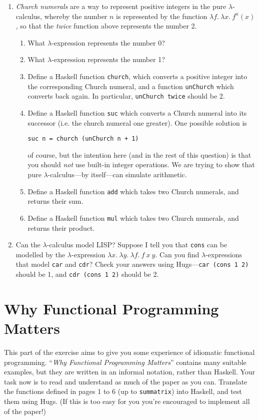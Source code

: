\documentclass{article}
\begin{document}
\begin{enumerate}
\item
{\em Church numerals} are a way to represent positive integers in the
pure $\lambda$-calculus, whereby the number $n$ is represented by the
function $\lambda f.~\lambda x.~f^n(x)$, so that the {\it twice}
function above represents the number 2.
\begin{enumerate}
\item
What $\lambda$-expression represents the number 0? 
\item
What $\lambda$-expression represents the number 1? 
\item 
Define a Haskell function \verb!church!, which converts a positive
integer into the corresponding Church numeral, and a function
\verb!unChurch! which converts back again. In particular,
\verb!unChurch twice! should be 2. 
\item 
Define a Haskell function \verb!suc! which converts a Church numeral
into its successor (i.e. the church numeral one greater). One possible
solution is 
\begin{verbatim}
suc n = church (unChurch n + 1)
\end{verbatim}
of course, but the intention here (and in the rest of this question)
is that you should {\em not} use built-in integer operations. We are
trying to show that pure $\lambda$-calculus---by itself---can simulate
arithmetic. 
\item 
Define a Haskell function \verb!add! which takes two Church numerals,
and returns their sum. 
\item 
Define a Haskell function \verb!mul! which takes two Church numerals,
and returns their product. 
\end{enumerate}
\item 
Can the $\lambda$-calculus model LISP? Suppose I tell you that
\verb!cons! can be modelled by the $\lambda$-expression $\lambda
x.~\lambda y.~\lambda f.~f~x~y$. Can you find $\lambda$-expressions
that model \verb!car! and \verb!cdr!? Check your answers using
Hugs---\verb!car (cons 1 2)! should be 1, and \verb!cdr (cons 1 2)!
should be 2.

\end{enumerate}


\section{Why Functional Programming Matters}
 This part of the exercise aims to give you some
experience of idiomatic functional programming. ``{\em Why Functional
  Programming Matters}'' contains many suitable examples, but they are
written in an informal notation, rather than Haskell. Your task now is
to read and understand as much of the paper as you can. Translate the
functions defined in pages 1 to 6 (up to \texttt{summatrix}) into
Haskell, and test them using Hugs. (If this is too easy for you you're
encouraged to implement all of the paper!)
\end{document}
